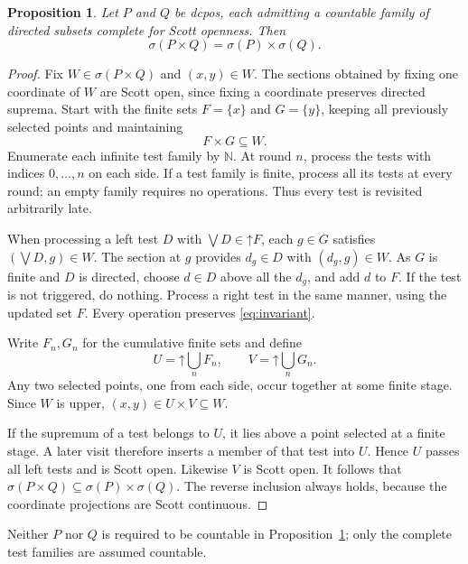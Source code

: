 \documentclass[preprint,11pt]{elsarticle}
\newtheorem{proposition}[theorem]{Proposition}
\theoremstyle{definition}
\theoremstyle{remark}
\numberwithin{equation}{section}
\newcommand{\N}{\mathbb N}
\newcommand{\up}[1]{\mathord{\uparrow}#1}
\newcommand{\Sc}{\sigma}
\begin{document}
\begin{proposition}\label{prop:countable-test-product}
Let $P$ and $Q$ be dcpos, each admitting a countable family of directed subsets complete for Scott openness. Then
\[
 \Sc(P\times Q)=\Sc(P)\times\Sc(Q).
\]
\end{proposition}
\begin{proof}
Fix $W\in\Sc(P\times Q)$ and $(x,y)\in W$. The sections obtained by fixing one coordinate of $W$ are Scott open, since fixing a coordinate preserves directed suprema. Start with the finite sets $F=\{x\}$ and $G=\{y\}$, keeping all previously selected points and maintaining
\begin{equation}\label{eq:invariant}
 F\times G\subseteq W.
\end{equation}
Enumerate each infinite test family by $\N$. At round $n$, process the tests with indices $0,\ldots,n$ on each side. If a test family is finite, process all its tests at every round; an empty family requires no operations. Thus every test is revisited arbitrarily late.

When processing a left test $D$ with $\bigvee D\in\up F$, each $g\in G$ satisfies $(\bigvee D,g)\in W$. The section at $g$ provides $d_g\in D$ with $(d_g,g)\in W$. As $G$ is finite and $D$ is directed, choose $d\in D$ above all the $d_g$, and add $d$ to $F$. If the test is not triggered, do nothing. Process a right test in the same manner, using the updated set $F$. Every operation preserves \eqref{eq:invariant}.

Write $F_n,G_n$ for the cumulative finite sets and define
\begin{equation}\label{eq:rectangle}
 U=\up{\bigcup_nF_n},\qquad
 V=\up{\bigcup_nG_n}.
\end{equation}
Any two selected points, one from each side, occur together at some finite stage. Since $W$ is upper, $(x,y)\in U\times V\subseteq W$.

If the supremum of a test belongs to $U$, it lies above a point selected at a finite stage. A later visit therefore inserts a member of that test into $U$. Hence $U$ passes all left tests and is Scott open. Likewise $V$ is Scott open. It follows that $\Sc(P\times Q)\subseteq\Sc(P)\times\Sc(Q)$. The reverse inclusion always holds, because the coordinate projections are Scott continuous.
\end{proof}

Neither $P$ nor $Q$ is required to be countable in Proposition~\ref{prop:countable-test-product}; only the complete test families are assumed countable.
\end{document}

